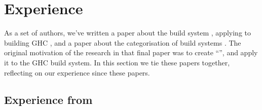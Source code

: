 \section{Experience}\label{sec-experience}

As a set of authors, we've written a paper about the \Shake build system \cite{mitchell2012shake},
applying \Shake to building GHC \cite{hadrian}, and a paper about the categorisation of build
systems \cite{mokhov2018buildsystems}. The original motivation of the research in that final paper was to create
``\Cloud \Shake'', and apply it to the GHC build system. In this section we tie these papers together,
reflecting on our experience since these papers.

\subsection{Experience from \Shake}\label{sec-experience-shake}

